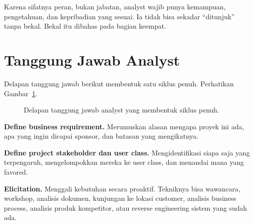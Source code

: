 \documentclass[11pt,a4paper]{article}
\begin{document}
Karena sifatnya peran, bukan jabatan, analyst wajib punya kemampuan, pengetahuan, dan kepribadian yang sesuai. Ia tidak bisa sekadar ``ditunjuk'' tanpa bekal. Bekal itu dibahas pada bagian keempat.

\section{Tanggung Jawab Analyst}

Delapan tanggung jawab berikut membentuk satu siklus penuh. Perhatikan Gambar~\ref{fig:wheel}.

\begin{figure}[H]
	\centering
	\caption{Delapan tanggung jawab analyst yang membentuk siklus penuh.}
	\label{fig:wheel}
\end{figure}

\textbf{Define business requirement.} Merumuskan alasan mengapa proyek ini ada, apa yang ingin dicapai sponsor, dan batasan yang mengikatnya.

\textbf{Define project stakeholder dan user class.} Mengidentifikasi siapa saja yang terpengaruh, mengelompokkan mereka ke user class, dan menandai mana yang favored.

\textbf{Elicitation.} Menggali kebutuhan secara proaktif. Tekniknya bisa wawancara, workshop, analisis dokumen, kunjungan ke lokasi customer, analisis business process, analisis produk kompetitor, atau reverse engineering sistem yang sudah ada.
\end{document}
